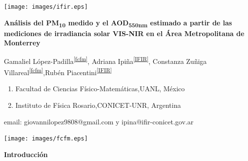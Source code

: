 \documentclass{article}
\begin{document}
\vspace*{-2cm}
\changefontsizes{14pt}
\hspace*{-1cm}
\begin{minipage}{0.2\linewidth}
\vspace{0.7cm}
\vspace*{-0.15cm}
\texttt{[image: images/ifir.eps]}
\end{minipage}
\vspace*{-0.4cm}
\begin{minipage}{0.6\linewidth}
\vspace*{0.7cm}
\begin{center}
\changefontsizes{15pt}
\hspace*{-0.1cm}
\textbf{\textcolor{title}{Análisis del PM\textsubscript{10} medido y el AOD\textsubscript{550nm} estimado a partir de las mediciones de irradiancia solar VIS-NIR en el Área Metropolitana de Monterrey}}
\end{center}
\vspace{-1cm}
\begin{center}
\changefontsizes{11pt}
Gamaliel López-Padilla\textsuperscript{\ref{fcfm}}, Adriana Ipiña\textsuperscript{\ref{IFIR}}, Constanza Zuñiga Villareal\textsuperscript{\ref{fcfm}},Rubén Piacentini\textsuperscript{\ref{IFIR}}\\
\begin{enumerate}
    \centering
    \vspace{-0.25cm}
    \item Facultad de Ciencias Físico-Matemáticas,UANL, México \label{fcfm} \vspace{-0.25cm}
    \item Instituto de Física Rosario,CONICET-UNR, Argentina \label{IFIR} \vspace{-0.25cm}
\end{enumerate}
email: giovannilopez9808@gmail.com y ipina@ifir-conicet.gov.ar
\end{center}
\end{minipage}
\begin{minipage}{0.2\linewidth}
\hspace*{0.2cm}
\texttt{[image: images/fcfm.eps]}
\end{minipage}
\vspace{0.2cm}
\changefontsizes{12pt}
\begin{center}
\begin{shaded}
\textbf{\textcolor{ver}{Introducción}}
\end{shaded}
\end{center}
\end{document}
